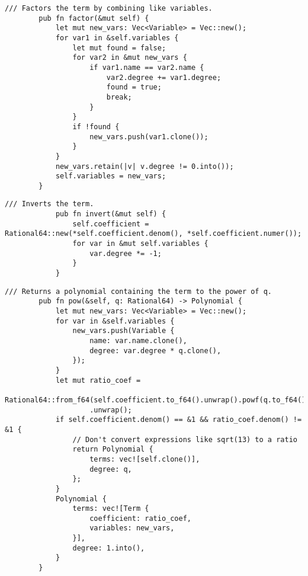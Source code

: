     \begin{lstlisting}[caption={The implementation of the \texttt{factor()} method for the \texttt{Term} struct}, label={lst:term-factor}]
        /// Factors the term by combining like variables.
        pub fn factor(&mut self) {
            let mut new_vars: Vec<Variable> = Vec::new();
            for var1 in &self.variables {
                let mut found = false;
                for var2 in &mut new_vars {
                    if var1.name == var2.name {
                        var2.degree += var1.degree;
                        found = true;
                        break;
                    }
                }
                if !found {
                    new_vars.push(var1.clone());
                }
            }
            new_vars.retain(|v| v.degree != 0.into());
            self.variables = new_vars;
        }
    \end{lstlisting}

    \begin{minipage}{\linewidth}
        \begin{lstlisting}[caption={The implementation of the \texttt{invert()} method for the \texttt{Term} struct}, label={lst:term-invert}]
            /// Inverts the term.
            pub fn invert(&mut self) {
                self.coefficient = Rational64::new(*self.coefficient.denom(), *self.coefficient.numer());
                for var in &mut self.variables {
                    var.degree *= -1;
                }
            }
        \end{lstlisting}
    \end{minipage}

    \begin{lstlisting}[caption={The implementation of the \texttt{pow()} method for the \texttt{Term} struct}, label={lst:term-pow}]
        /// Returns a polynomial containing the term to the power of q.
        pub fn pow(&self, q: Rational64) -> Polynomial {
            let mut new_vars: Vec<Variable> = Vec::new();
            for var in &self.variables {
                new_vars.push(Variable {
                    name: var.name.clone(),
                    degree: var.degree * q.clone(),
                });
            }
            let mut ratio_coef =
                Rational64::from_f64(self.coefficient.to_f64().unwrap().powf(q.to_f64().unwrap()))
                    .unwrap();
            if self.coefficient.denom() == &1 && ratio_coef.denom() != &1 {
                // Don't convert expressions like sqrt(13) to a ratio
                return Polynomial {
                    terms: vec![self.clone()],
                    degree: q,
                };
            }
            Polynomial {
                terms: vec![Term {
                    coefficient: ratio_coef,
                    variables: new_vars,
                }],
                degree: 1.into(),
            }
        }
    \end{lstlisting}

